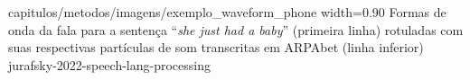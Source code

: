 
{capitulos/metodos/imagens/exemplo_waveform_phone}
{width=0.90\textwidth}
{Formas de onda da fala para a sentença ``\textit{she just had a baby}'' (primeira linha) rotuladas com suas respectivas partículas de som transcritas em ARPAbet (linha inferior)}
{jurafsky-2022-speech-lang-processing}






